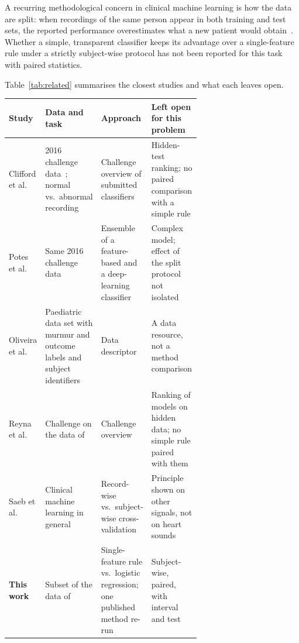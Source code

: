 A recurring methodological concern in clinical machine learning is how the data are split:
when recordings of the same person appear in both training and test sets, the reported
performance overestimates what a new patient would obtain~\cite{Saeb2017}. Whether a simple,
transparent classifier keeps its advantage over a single-feature rule under a strictly
subject-wise protocol has not been reported for this task with paired statistics.

Table~\ref{tab:related} summarises the closest studies and what each leaves open.

\begin{genistablo}
\caption{Closest related work and the gap addressed here. \emph{(Example rows: replace with the
5--7 studies closest to your own project; every row needs a DOI in \texttt{refs.bib}.)}}
\label{tab:related}
\centering
\footnotesize
\begin{tabularx}{\linewidth}{@{}p{0.19\linewidth}p{0.25\linewidth}p{0.21\linewidth}X@{}}
\toprule
Study & Data and task & Approach & Left open for this problem \\
\midrule
Clifford et al.~\cite{Clifford2016} & 2016 challenge data~\cite{Liu2016}; normal vs.\ abnormal recording & Challenge overview of submitted classifiers & Hidden-test ranking; no paired comparison with a simple rule \\
Potes et al.~\cite{Potes2016} & Same 2016 challenge data & Ensemble of a feature-based and a deep-learning classifier & Complex model; effect of the split protocol not isolated \\
Oliveira et al.~\cite{Oliveira2022} & Paediatric data set with murmur and outcome labels and subject identifiers & Data descriptor & A data resource, not a method comparison \\
Reyna et al.~\cite{Reyna2023} & Challenge on the data of~\cite{Oliveira2022} & Challenge overview & Ranking of models on hidden data; no simple rule paired with them \\
Saeb et al.~\cite{Saeb2017} & Clinical machine learning in general & Record-wise vs.\ subject-wise cross-validation & Principle shown on other signals, not on heart sounds \\
\midrule
\textbf{This work} & Subset of the data of~\cite{Oliveira2022} & Single-feature rule vs.\ logistic regression; one published method re-run & Subject-wise, paired, with interval and test \\
\bottomrule
\end{tabularx}
\end{genistablo}

